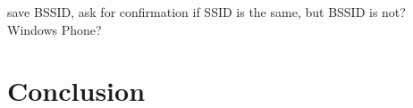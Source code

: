 \documentclass[12pt,a4paper,oneside,pdftex]{report}
\begin{document}
save BSSID, ask for confirmation if SSID is the same, but BSSID is not? Windows Phone? 




\chapter{Conclusion}
\label{chapter:conclusion}


% 





\end{document}
